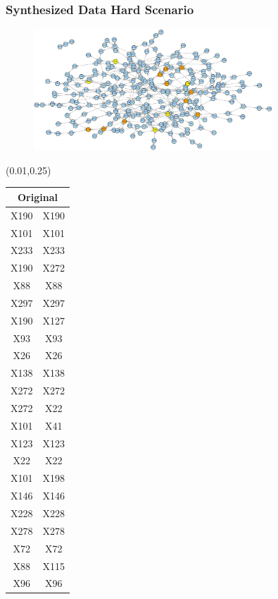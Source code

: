 \documentclass{beamer}
\newcommand{\boz}{\cellcolor{pathwaynode}}
\newcommand{\ghool}{\cellcolor{independentnode}}
\begin{document}
\begin{frame}
  \frametitle{Synthesized Data Hard Scenario}
  \begin{figure}
    \includegraphics[width=0.8\textwidth]{synthesized-hard}
  \end{figure}
  \begin{textblock*}{\paperwidth}(0.01\textwidth,0.25\textheight)
    \raggedright 
    \tiny
    \begin{tabular}{| c c |}
      \hline
\toprule
\multicolumn{2}{c}{Original} \\ 
\midrule \hline
\boz X190   &  \boz X190  \\ \hline
X101   &  X101  \\ \hline
X233   &  X233  \\ \hline
\boz X190   &  \boz X272  \\ \hline
\ghool X88   &  \ghool X88  \\ \hline
X297   &  X297  \\ \hline
\boz X190   &  X127  \\ \hline
X93   &  X93  \\ \hline
X26   &  X26  \\ \hline
\boz X138   &  \boz X138  \\ \hline
\boz X272   &  \boz X272  \\ \hline
\boz X272   &  \boz X22  \\ \hline
X101   &  X41  \\ \hline
X123   &  X123  \\ \hline
\boz X22   &  \boz X22  \\ \hline
X101   &  X198  \\ \hline
X146   &  X146  \\ \hline
\boz X228   &  \boz X228  \\ \hline
X278   &  X278  \\ \hline
X72   &  X72  \\ \hline
\ghool X88   &  X115  \\ \hline
\ghool X96   &  \ghool X96  \\ \hline

\end{tabular}
\end{textblock*}
\end{frame}
\end{document}
